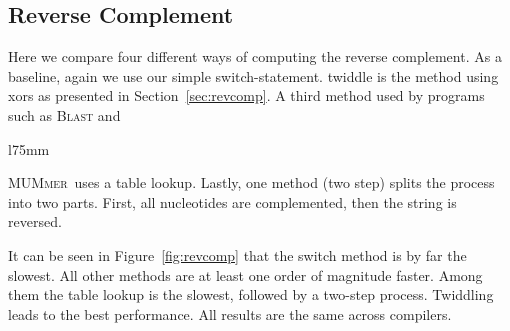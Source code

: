 \documentclass[10pt,letterpaper]{article}
\begin{document}
\subsection{Reverse Complement}
{
Here we compare four different ways of computing the reverse complement. As a baseline, again we use our simple switch-statement. twiddle is the method using xors as presented in Section~\ref{sec:revcomp}. A third method used by programs such as \textsc{Blast} and


\begin{wrapfigure}{l}{75mm}
    \captionsetup{labelformat=empty} %
    \caption{}
    \label{fig:revcomp}
\end{wrapfigure}
\noindent  \textsc{MUMmer}~uses a table lookup. Lastly, one method (two step) splits the process into two parts. First, all nucleotides are complemented, then the string is reversed.

It can be seen in Figure~\ref{fig:revcomp} that the switch method is by far the slowest. All other methods are at least one order of magnitude faster. Among them the table lookup is the slowest, followed by a two-step process. Twiddling leads to the best performance. All results are the same across compilers.

}
\end{document}
